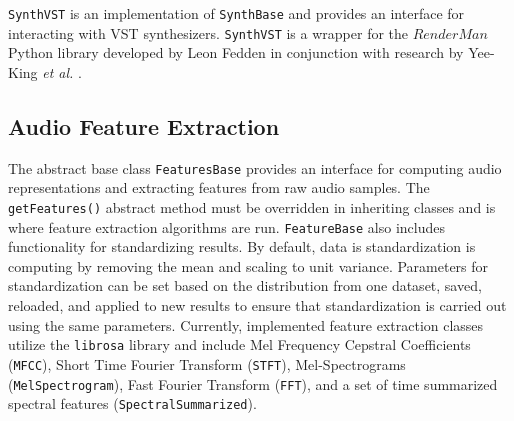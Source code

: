 %

\texttt{SynthVST} is an implementation of \texttt{SynthBase} and provides an interface for interacting with VST synthesizers. \texttt{SynthVST} is a wrapper for the $RenderMan$ Python library developed by Leon Fedden in conjunction with research by Yee-King \textit{et al.} \cite{yee2018automatic}.

\subsection{Audio Feature Extraction}
The abstract base class \texttt{FeaturesBase} provides an interface for computing audio representations and extracting features from raw audio samples. The \texttt{getFeatures()} abstract method must be overridden in inheriting classes and is where feature extraction algorithms are run.  \texttt{FeatureBase} also includes functionality for standardizing results. By default, data is standardization is computing by removing the mean and scaling to unit variance. Parameters for standardization can be set based on the distribution from one dataset, saved, reloaded, and applied to new results to ensure that standardization is carried out using the same parameters. Currently, implemented feature extraction classes utilize the \texttt{librosa} library \cite{mcfee2015librosa} and include Mel Frequency Cepstral Coefficients (\texttt{MFCC}), Short Time Fourier Transform (\texttt{STFT}), Mel-Spectrograms (\texttt{MelSpectrogram}), Fast Fourier Transform (\texttt{FFT}), and a set of time summarized spectral features (\texttt{SpectralSummarized}).

